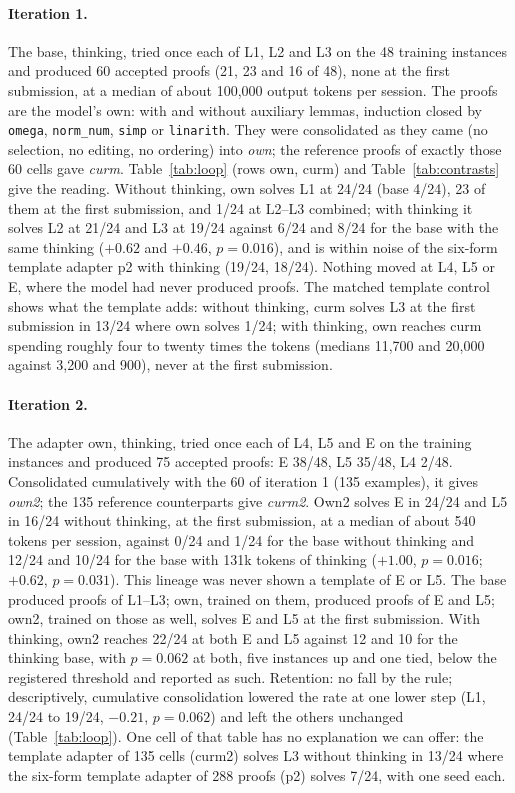 \documentclass[11pt]{article}
\begin{document}
\paragraph{Iteration 1.} The base, thinking, tried once each of L1, L2 and
L3 on the 48 training instances and produced 60 accepted proofs (21, 23
and 16 of 48), none at the first submission, at a median of about 100,000
output tokens per session. The proofs are the model's own: with and
without auxiliary lemmas, induction closed by \texttt{omega},
\texttt{norm\_num}, \texttt{simp} or \texttt{linarith}. They were
consolidated as they came (no selection, no editing, no ordering) into
\emph{own}; the reference proofs of exactly those 60 cells gave
\emph{curm}. Table~\ref{tab:loop} (rows own, curm) and
Table~\ref{tab:contrasts} give the reading. Without thinking, own solves
L1 at 24/24 (base 4/24), 23 of them at the first submission, and 1/24 at
L2--L3 combined; with thinking it solves L2 at 21/24 and L3 at 19/24
against 6/24 and 8/24 for the base with the same thinking ($+0.62$ and
$+0.46$, $p=0.016$), and is within noise of the six-form template adapter
p2 with thinking (19/24, 18/24). Nothing moved at L4, L5 or E, where the
model had never produced proofs. The matched template control shows what the template adds: without thinking, curm solves L3 at the first
submission in 13/24 where own solves 1/24; with thinking, own reaches curm
spending roughly four to twenty times the tokens (medians 11,700 and
20,000 against 3,200 and 900), never at the first submission.

\paragraph{Iteration 2.} The adapter own, thinking, tried once each of L4,
L5 and E on the training instances and produced 75 accepted proofs: E
38/48, L5 35/48, L4 2/48. Consolidated cumulatively with the 60 of
iteration 1 (135 examples), it gives \emph{own2}; the 135 reference
counterparts give \emph{curm2}. Own2 solves E in 24/24 and L5 in 16/24
without thinking, at the first submission, at a median of about 540 tokens
per session, against 0/24 and 1/24 for the base without thinking and
12/24 and 10/24 for the base with 131k tokens of thinking ($+1.00$,
$p=0.016$; $+0.62$, $p=0.031$). This lineage was never shown a template of E or L5. The base produced proofs of L1--L3; own, trained on them, produced proofs of E and L5; own2, trained on those as well, solves E and L5 at the first submission. With thinking, own2 reaches 22/24 at both E and
L5 against 12 and 10 for the thinking base, with $p=0.062$ at both, five
instances up and one tied, below the registered threshold and reported as
such. Retention: no fall by the rule; descriptively, cumulative
consolidation lowered the rate at one lower step (L1, 24/24 to 19/24,
$-0.21$, $p=0.062$) and left the others unchanged (Table~\ref{tab:loop}).
One cell of that table has no explanation we can offer: the template
adapter of 135 cells (curm2) solves L3 without thinking in 13/24 where
the six-form template adapter of 288 proofs (p2) solves 7/24, with one
seed each.
\end{document}
